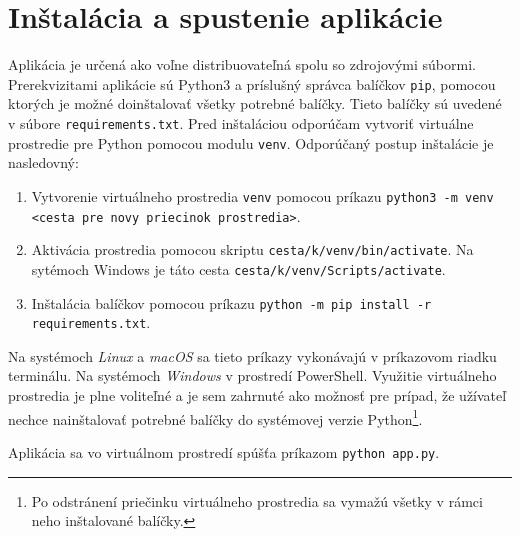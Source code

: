 
\chapter{Inštalácia a spustenie aplikácie} \label{sec:instalacia}
  Aplikácia je určená ako voľne distribuovateľná spolu so zdrojovými súbormi. Prerekvizitami aplikácie sú Python3 a príslušný správca balíčkov \texttt{pip},
  pomocou ktorých je možné doinštalovať všetky potrebné balíčky. Tieto balíčky sú uvedené v súbore \texttt{requirements.txt}. Pred inštaláciou odporúčam
  vytvoriť virtuálne prostredie pre Python pomocou modulu \texttt{venv}. Odporúčaný postup inštalácie je nasledovný:
  \begin{enumerate}
    \item Vytvorenie virtuálneho prostredia \texttt{venv} pomocou príkazu \texttt{python3 -m venv <cesta pre novy priecinok prostredia>}.
    \item Aktivácia prostredia pomocou skriptu \texttt{cesta/k/venv/bin/activate}. Na sytémoch Windows je táto cesta \texttt{cesta/k/venv/Scripts/activate}.
    \item Inštalácia balíčkov pomocou príkazu \texttt{python -m pip install -r requirements.txt}.
  \end{enumerate}
  Na systémoch \emph{Linux} a \emph{macOS} sa tieto príkazy vykonávajú v príkazovom riadku terminálu. Na systémoch \emph{Windows} v prostredí PowerShell.
  Využitie virtuálneho prostredia je plne voliteľné a je sem zahrnuté ako možnosť pre prípad, že užívateľ nechce nainštalovať potrebné balíčky do systémovej
  verzie Python\footnote{Po odstránení priečinku virtuálneho prostredia sa vymažú všetky v rámci neho inštalované balíčky.}.

  Aplikácia sa vo virtuálnom prostredí spúšťa príkazom \texttt{python app.py}.






